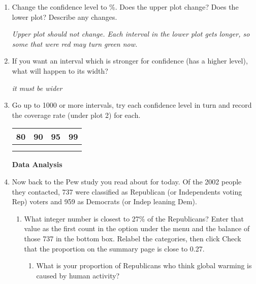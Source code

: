 \begin{enumerate}
\item Change the confidence level to \%. Does the upper plot
  change?  Does the lower plot?  Describe any changes.
\begin{students}
  \vspace{1cm}
\end{students}
\begin{key}
  {\it Upper plot should not change. Each interval in the lower plot
    gets longer, so some that were red may turn green now.}
\end{key}


\item If you want an interval which is stronger for confidence
  (has a higher level), what will happen to its width?
\begin{students}
  \vspace{.6cm}
\end{students}
\begin{key}
  {\it it must be wider}
\end{key}

  \item Go up to 1000 or more intervals, try each confidence level in
    turn and record the coverage rate   (under plot 2) for each.\\
    \begin{tabular}{|r|r|r|r|} \hline
      {\large 80} &  {\large 90} &  {\large 95} &  {\large 99}\\ \hline
   {\large  \phantom{90000} } & {\large \phantom{90000}  } &  {\large
     \phantom{90000} } &  {\large  \phantom{90000} } \\
       & & & \\ \hline
    \end{tabular}


    \begin{center}
      {\large\bf Data Analysis}
    \end{center}
  \item Now back to the Pew study you read about for today. Of the 2002 people
    they contacted, 737 were classified as Republican (or Independents
    voting Rep) voters and 959 as Democrats (or Indep leaning Dem).
    \begin{enumerate}
    \item What integer number is closest to 27\% of the Republicans?
      Enter that value as the first count  in the  option under the  menu   and the balance
      of those 737 in the bottom box. Relabel the
      categories, then click   Check that the
      proportion on the summary page is  close to 0.27. 
      \begin{enumerate}
      \item What is your proportion of Republicans who think global
        warming is caused by human activity?
\begin{students}
\vspace{.8cm}
\end{students}


\end{enumerate}
\end{enumerate}
\end{enumerate}
